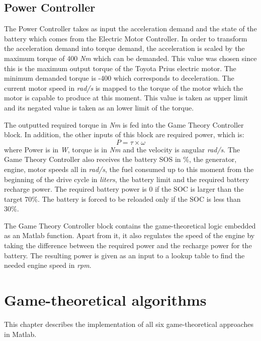 \subsection{Power Controller}
The Power Controller takes as input the acceleration demand and the state of the battery which comes from the Electric Motor Controller. In order to transform the acceleration demand into torque demand, the acceleration is scaled by the maximum torque of 400 \textit{Nm} which can be demanded. This value was chosen since this is the maximum output torque of the Toyota Prius electric motor. The minimum demanded torque is -400 which corresponds to deceleration. The current motor speed in \textit{rad/s} is mapped to the torque of the motor which the motor is capable to produce at this moment. This value is taken as upper limit and its negated value is taken as an lower limit of the torque. 

The outputted required torque in \textit{Nm} is fed into the Game Theory Controller block. In addition, the other inputs of this block are required power, which is:
\begin{equation}
P = \tau \times \omega
\end{equation}
where Power is in \textit{W}, torque is in \textit{Nm} and the velocity is angular \textit{rad/s}.
The Game Theory Controller also receives the battery SOS in \%, the generator, engine, motor speeds all in \textit{rad/s}, the fuel consumed up to this moment from the beginning of the drive cycle in \textit{liters}, the battery limit and the required battery recharge power. The required battery power is 0 if the SOC is larger than the target 70\%. The battery is forced to be reloaded only if the SOC is less than 30\%.

The Game Theory Controller block contains the game-theoretical logic embedded as an Matlab function. Apart from it, it also regulates the speed of the engine by taking the difference between the required power and the recharge power for the battery. The resulting power is given as an input to a lookup table to find the needed engine speed in \textit{rpm}. 

\section{Game-theoretical algorithms}
This chapter describes the implementation of all six game-theoretical approaches in Matlab.